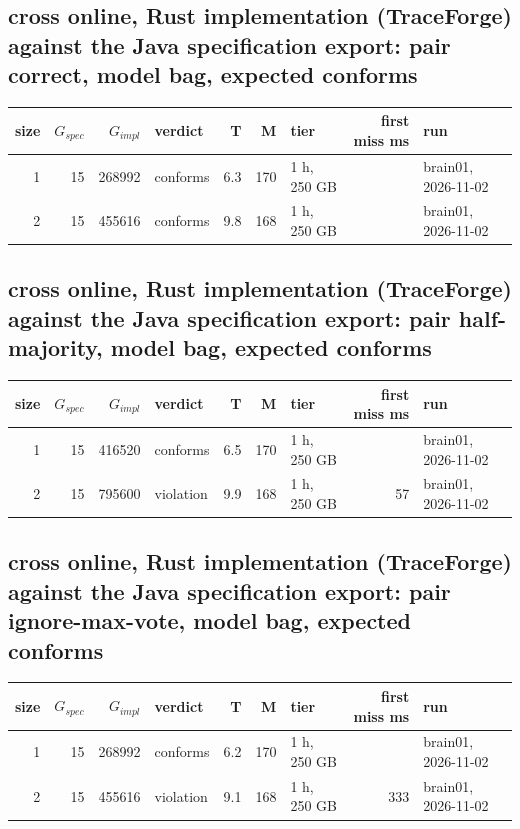 \documentclass[10pt]{article}
\begin{document}
\subsection*{cross online, Rust implementation (TraceForge) against the Java specification export: pair \textsf{correct}, model bag, expected conforms}
\begin{longtable}{@{}rrrlrrlrl@{}}
\toprule
size & $G_{\mathit{spec}}$ & $G_{\mathit{impl}}$ & verdict & T & M & tier & first miss ms & run \\
\midrule
\endhead
\color{red} 1 & 15 & 268992 & conforms & 6.3 & 170 & 1 h, 250 GB &  & brain01, 2026-11-02 \\
\color{red} 2 & 15 & 455616 & conforms & 9.8 & 168 & 1 h, 250 GB &  & brain01, 2026-11-02 \\
\bottomrule
\end{longtable}
\subsection*{cross online, Rust implementation (TraceForge) against the Java specification export: pair \textsf{half-majority}, model bag, expected conforms}
\begin{longtable}{@{}rrrlrrlrl@{}}
\toprule
size & $G_{\mathit{spec}}$ & $G_{\mathit{impl}}$ & verdict & T & M & tier & first miss ms & run \\
\midrule
\endhead
\color{red} 1 & 15 & 416520 & conforms & 6.5 & 170 & 1 h, 250 GB &  & brain01, 2026-11-02 \\
\color{red} 2 & 15 & 795600 & violation & 9.9 & 168 & 1 h, 250 GB & 57 & brain01, 2026-11-02 \\
\bottomrule
\end{longtable}
\subsection*{cross online, Rust implementation (TraceForge) against the Java specification export: pair \textsf{ignore-max-vote}, model bag, expected conforms}
\begin{longtable}{@{}rrrlrrlrl@{}}
\toprule
size & $G_{\mathit{spec}}$ & $G_{\mathit{impl}}$ & verdict & T & M & tier & first miss ms & run \\
\midrule
\endhead
\color{red} 1 & 15 & 268992 & conforms & 6.2 & 170 & 1 h, 250 GB &  & brain01, 2026-11-02 \\
\color{red} 2 & 15 & 455616 & violation & 9.1 & 168 & 1 h, 250 GB & 333 & brain01, 2026-11-02 \\
\bottomrule
\end{longtable}
\end{document}
